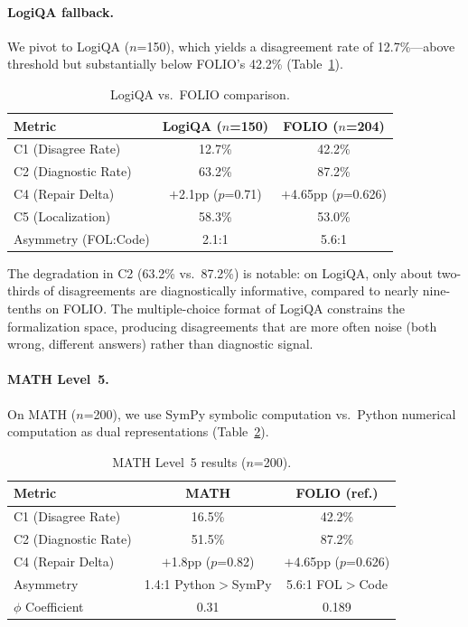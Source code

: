 \documentclass[11pt]{article}
\begin{document}
\paragraph{LogiQA fallback.} We pivot to LogiQA ($n$=150), which yields a disagreement rate of 12.7\%---above threshold but substantially below FOLIO's 42.2\% (Table~\ref{tab:logiqua}).

\begin{table}[t]
\centering
\caption{LogiQA vs.\ FOLIO comparison.}
\label{tab:logiqua}
\begin{tabular}{lcc}
\toprule
Metric & LogiQA ($n$=150) & FOLIO ($n$=204) \\
\midrule
C1 (Disagree Rate)  & 12.7\% & 42.2\% \\
C2 (Diagnostic Rate) & 63.2\% & 87.2\% \\
C4 (Repair Delta) & $+$2.1pp ($p$=0.71) & $+$4.65pp ($p$=0.626) \\
C5 (Localization) & 58.3\% & 53.0\% \\
Asymmetry (FOL:Code) & 2.1:1 & 5.6:1 \\
\bottomrule
\end{tabular}
\end{table}

The degradation in C2 (63.2\% vs.\ 87.2\%) is notable: on LogiQA, only about two-thirds of disagreements are diagnostically informative, compared to nearly nine-tenths on FOLIO. The multiple-choice format of LogiQA constrains the formalization space, producing disagreements that are more often noise (both wrong, different answers) rather than diagnostic signal.

\paragraph{MATH Level~5.} On MATH ($n$=200), we use SymPy symbolic computation vs.\ Python numerical computation as dual representations (Table~\ref{tab:math}).

\begin{table}[t]
\centering
\caption{MATH Level~5 results ($n$=200).}
\label{tab:math}
\begin{tabular}{lcc}
\toprule
Metric & MATH & FOLIO (ref.) \\
\midrule
C1 (Disagree Rate) & 16.5\% & 42.2\% \\
C2 (Diagnostic Rate) & 51.5\% & 87.2\% \\
C4 (Repair Delta) & $+$1.8pp ($p$=0.82) & $+$4.65pp ($p$=0.626) \\
Asymmetry & 1.4:1 Python$>$SymPy & 5.6:1 FOL$>$Code \\
$\phi$ Coefficient & 0.31 & 0.189 \\
\bottomrule
\end{tabular}
\end{table}
\end{document}
